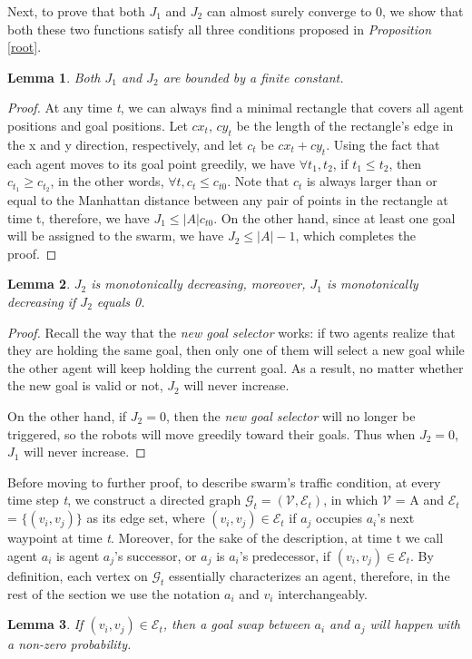 \documentclass[journal]{IEEEtran}
\newtheorem{lemma}{Lemma}[subsection]
\begin{document}
Next, to prove that both $J_1$ and $J_2$ can almost surely converge to 0, we show that both these two functions satisfy all three conditions proposed in \textit{Proposition} \ref{root}.

\begin{lemma} 
Both $J_1$ and $J_2$ are bounded by a finite constant.
\label{lemma1}
\end{lemma}
\begin{proof} 
At any time \textit{t}, we can always find a minimal rectangle that covers all agent positions and goal positions.  Let $cx_t$, $cy_t$ be the length of the rectangle's edge in the x and y direction, respectively, and let $c_t$ be $cx_t + cy_t$. Using the fact that each agent moves to its goal point greedily, we have $\forall t_1, t_2$, if $ t_1 \leq t_2$, then $c_{t_1} \geq c_{t_2}$, in the other words, $\forall t, c_t \leq c_{t0}$. Note that $c_t$ is always larger than or equal to the Manhattan distance between any pair of points in the rectangle at time t, therefore, we have $J_1 \leq |A|c_{t0}$. On the other hand, since at least one goal will be assigned to the swarm, we have $J_2\leq|A| - 1$, which completes the proof.
\end{proof}

\begin{lemma} 
$J_2$ is monotonically decreasing, moreover, $J_1$ is monotonically decreasing if $J_2$ equals 0.
\label{lemma2}
\end{lemma}

\begin{proof}
Recall the way that the \textit{new goal selector} works: if two agents realize that they are holding the same goal, then only one of them will select a new goal while the other agent will keep holding the current goal. As a result, no matter whether the new goal is valid or not, $J_2$ will never increase.

On the other hand, if $J_2 = 0$, then the \textit{new goal selector} will no longer be triggered, so the robots will move greedily toward their goals. Thus when $J_2 = 0$, $J_1$ will never increase.
\end{proof}


Before moving to further proof, to describe swarm's traffic condition, at every time step \textit{t}, we construct a directed graph $\mathcal{G}_t = (\mathcal{V}, \mathcal{E}_t)$, in which $\mathcal{V}$ = A and $\mathcal{E}_t$ = $\{(v_i, v_j)\}$ as its edge set, where $(v_i, v_j)\in \mathcal{E}_t$ if $a_j$ occupies $a_i$'s next waypoint at time \textit{t}. Moreover, for the sake of the description, at time t we call agent $a_i$ is agent $a_j$'s successor, or $a_j$ is $a_i$'s predecessor, if $(v_i, v_j)\in\mathcal{E}_t$. By definition, each vertex on $\mathcal{G}_{t}$ essentially characterizes an agent, therefore, in the rest of the section we use the notation $a_i$ and $v_i$ interchangeably.
\begin{lemma} 
If $(v_i, v_j)\in \mathcal{E}_t$, then a goal swap between $a_i$ and $a_j$ will happen with a non-zero probability. 
\label{fact1}


\end{lemma}
\end{document}
